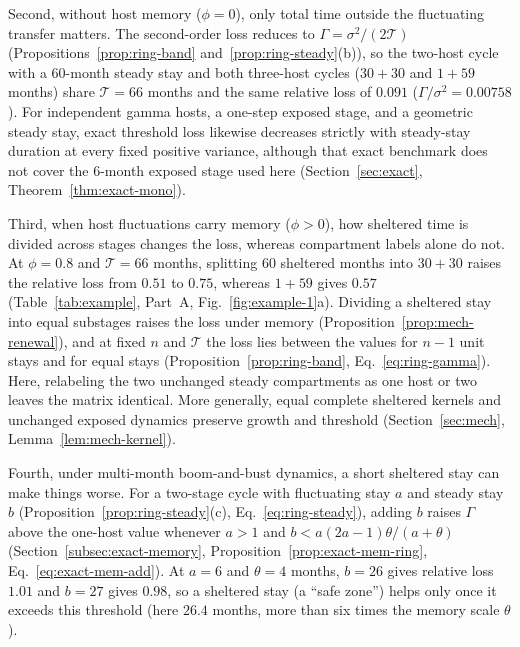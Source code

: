 Second, without host memory ($\phi = 0$), only total time outside the fluctuating transfer matters. The second-order loss reduces to $\Gamma = \sigma^2/(2\mathcal{T})$ (Propositions~\ref{prop:ring-band} and~\ref{prop:ring-steady}(b)), so the two-host cycle with a $60$-month steady stay and both three-host cycles ($30 + 30$ and $1 + 59$ months) share $\mathcal{T} = 66$ months and the same relative loss of $0.091$ ($\Gamma/\sigma^2 = 0.00758$). For independent gamma hosts, a one-step exposed stage, and a geometric steady stay, exact threshold loss likewise decreases strictly with steady-stay duration at every fixed positive variance, although that exact benchmark does not cover the $6$-month exposed stage used here (Section~\ref{sec:exact}, Theorem~\ref{thm:exact-mono}).

Third, when host fluctuations carry memory ($\phi > 0$), how sheltered time is divided across stages changes the loss, whereas compartment labels alone do not. At $\phi = 0.8$ and $\mathcal{T} = 66$ months, splitting $60$ sheltered months into $30 + 30$ raises the relative loss from $0.51$ to $0.75$, whereas $1 + 59$ gives $0.57$ (Table~\ref{tab:example}, Part~A, Fig.~\ref{fig:example-1}a). Dividing a sheltered stay into equal substages raises the loss under memory (Proposition~\ref{prop:mech-renewal}), and at fixed $n$ and $\mathcal{T}$ the loss lies between the values for $n - 1$ unit stays and for equal stays (Proposition~\ref{prop:ring-band}, Eq.~\eqref{eq:ring-gamma}). Here, relabeling the two unchanged steady compartments as one host or two leaves the matrix identical. More generally, equal complete sheltered kernels and unchanged exposed dynamics preserve growth and threshold (Section~\ref{sec:mech}, Lemma~\ref{lem:mech-kernel}).

Fourth, under multi-month boom-and-bust dynamics, a short sheltered stay can make things worse. For a two-stage cycle with fluctuating stay $a$ and steady stay $b$ (Proposition~\ref{prop:ring-steady}(c), Eq.~\eqref{eq:ring-steady}), adding $b$ raises $\Gamma$ above the one-host value whenever $a > 1$ and $b < a(2a - 1)\theta/(a + \theta)$ (Section~\ref{subsec:exact-memory}, Proposition~\ref{prop:exact-mem-ring}, Eq.~\eqref{eq:exact-mem-add}). At $a = 6$ and $\theta = 4$ months, $b = 26$ gives relative loss $1.01$ and $b = 27$ gives $0.98$, so a sheltered stay (a ``safe zone'') helps only once it exceeds this threshold (here $26.4$ months, more than six times the memory scale $\theta$).

